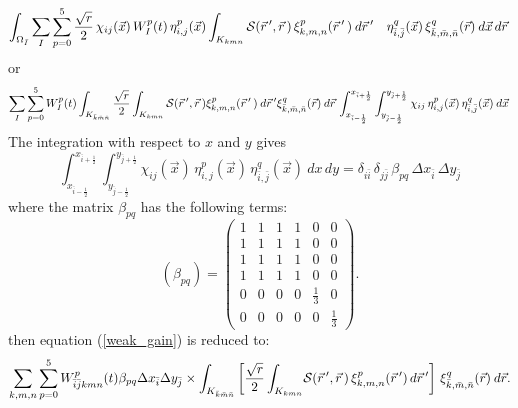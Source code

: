 \documentclass[11pt]{article}
\newcommand{\ot}{\frac{1}{2}}
\newcommand{\ib}{\bar{i}} %
\newcommand{\jb}{\bar{j}} %
\newcommand{\kb}{\bar{k}} %
\newcommand{\mb}{\bar{m}} %
\newcommand{\nb}{\bar{n}} %
\begin{document}
{\small
\begin{equation}
 \int_{\Omega_{{{ \bar{I} }}}} %
\sum_{I} \sum_{p=0}^{5}  \frac{\sqrt{r}}{2}  \,
\chi_{ij}(\vec{x}) \, W_{I}^p (t) \, \eta^{p}_{i,j}(\vec{x})
\int_{K_{k m n}}
{\cal S}(\vec{r}\,',\vec{r}\,) \, \xi^{p}_{k,m,n}(\vec{r}\,'\,)
\: d\vec{r} \, ' 
\quad
\eta^{q}_{\ib,\jb}(\vec{x}) \, \xi^{q}_{\kb,\mb,\nb}(\vec{r}) \:
d\vec{x} \, d\vec{r}  \,  \label{int_gain}
\end{equation}
%
or
\begin{equation}
\sum_{I} \sum_{p=0}^{5} W_{I}^p (t) %
\int_{K_{\kb \mb \nb}} \frac{\sqrt{r}}{2} %
\int_{K_{k m n}}
{\cal S}(\vec{r}\,',\vec{r}\,) \xi^{p}_{k,m,n}(\vec{r}\,'\,) \: 
d\vec{r}\,'%
\xi^{q}_{\kb,\mb,\nb}(\vec{r}) \: d\vec{r} %
\,
\int_{x_{\ib - \ot}}^{x_{\ib + \ot}} 
\int_{y_{\jb - \ot}}^{y_{\jb + \ot}} 
\chi_{ij}%
\, 
\eta^{p}_{i,j}(\vec{x}) \, \eta^{q}_{\ib,\jb}(\vec{x}) \: d\vec{x} \, 
\label{weak_gain}
\end{equation}
}
%
The integration with respect to $x$ and $y$ gives
$$
\int_{x_{\ib - \ot}}^{x_{\ib + \ot}} 
\int_{y_{\jb - \ot}}^{y_{\jb + \ot}} 
\chi_{ij}(\vec{x}) \, \eta^{p}_{i,j}(\vec{x}) \, \eta^{q}_{\ib,\jb}(\vec{x}) \: dx \, dy  =
\delta_{i \ib} \, \delta_{j \jb} \,
\beta_{p q} \, \Delta x_{\ib} \, \Delta y_{\jb}
$$
where the matrix $\beta_{p q}$ has the following terms:
$$
\left( \beta_{p q} \right) = \left( 
\begin{array}{cccccc}
1 & 1 & 1 & 1 & 0 & 0 \\
1 & 1 & 1 & 1 & 0 & 0 \\
1 & 1 & 1 & 1 & 0 & 0 \\
1 & 1 & 1 & 1 & 0 & 0 \\
0 & 0 & 0 & 0 & \frac{1}{3} & 0 \\ 
0 & 0 & 0 & 0 & 0 & \frac{1}{3}
\end{array}
\right) .
$$
then equation (\ref{weak_gain}) is reduced to:
%
{%
\begin{equation} \label{wxy_gain}
\sum_{k,m,n} \sum_{p=0}^{5} 
W_{\ib \jb kmn}^p(t) \beta_{p q} \Delta x_{\ib} \Delta y_{\jb} \times %
\int_{K_{\kb \mb \nb}} \left[ 
 \frac{\sqrt{r}}{2} \int_{K_{k m n}} \!
{\cal S}(\vec{r}\,',\vec{r}\,) \, \xi^{p}_{k,m,n}(\vec{r}\,') \,
d\vec{r}\,'\right] \,
\xi^{q}_{\kb,\mb,\nb}(\vec{r}) \: 
 d\vec{r} .
\end{equation}
}
\end{document}
